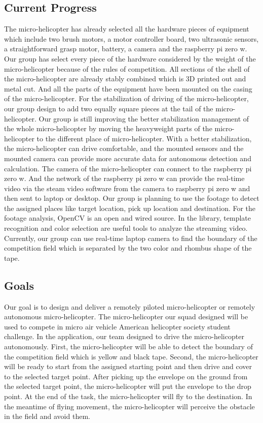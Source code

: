 \documentclass[onecolumn, draftclsnofoot,10pt, compsoc]{IEEEtran}
\begin{document}
\subsection{Current Progress}
The micro-helicopter has already selected all the hardware pieces of equipment which include two brush motors, a motor controller board, two ultrasonic sensors, a straightforward grasp motor, battery, a camera and the raspberry pi zero w. Our group has select every piece of the hardware considered by the weight of the micro-helicopter because of the rules of competition. All sections of the shell of the micro-helicopter are already stably combined which is 3D printed out and metal cut. And all the parts of the equipment have been mounted on the casing of the micro-helicopter. For the stabilization of driving of the micro-helicopter, our group design to add two equally square pieces at the tail of the micro-helicopter. Our group is still improving the better stabilization management of the whole micro-helicopter by moving the heavyweight parts of the micro-helicopter to the different place of micro-helicopter.
With a better stabilization, the micro-helicopter can drive comfortable, and the mounted sensors and the mounted camera can provide more accurate data for autonomous detection and calculation. The camera of the micro-helicopter can connect to the raspberry pi zero w. And the network of the raspberry pi zero w can provide the real-time video via the steam video software from the camera to raspberry pi zero w and then sent to laptop or desktop. Our group is planning to use the footage to detect the assigned places like target location, pick up location and destination. For the footage analysis, OpenCV is an open and wired source. In the library, template recognition and color selection are useful tools to analyze the streaming video. Currently, our group can use real-time laptop camera to find the boundary of the competition field which is separated by the two color and rhombus shape of the tape.

\subsection{Goals}
Our goal is to design and deliver a remotely piloted micro-helicopter or remotely autonomous micro-helicopter. The micro-helicopter our squad designed will be used to compete in micro air vehicle American helicopter society student challenge. In the application, our team designed to drive the micro-helicopter autonomously. First, the micro-helicopter will be able to detect the boundary of the competition field which is yellow and black tape. Second, the micro-helicopter will be ready to start from the assigned starting point and then drive and cover to the selected target point. After picking up the envelope on the ground from the selected target point, the micro-helicopter will put the envelope to the drop point. At the end of the task, the micro-helicopter will fly to the destination. In the meantime of flying movement, the micro-helicopter will perceive the obstacle in the field and avoid them.
\end{document}
